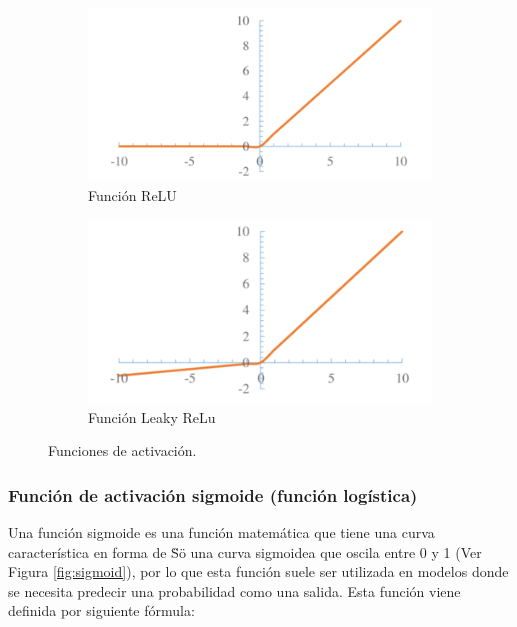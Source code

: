 \begin{figure}
        \begin{subfigure}[h]{0.45\textwidth} 
            \includegraphics[width=\textwidth]{imagenes/Cap4/relu}
            \caption{Funci\'{o}n ReLU}
            \label{fig:relu}
        \end{subfigure}       
        \begin{subfigure}[h]{0.45\textwidth} 
            \includegraphics[width=\textwidth]{imagenes/Cap4/l_relu}
            \caption{Funci\'{o}n Leaky ReLu}
            \label{fig:l_relu}
        \end{subfigure}
        \caption{Funciones de activaci\'{o}n.}
        
		\label{fig:nor_nor}
    \end{figure}
    
\subsubsection{Funci\'{o}n de activaci\'{o}n sigmoide (funci\'{o}n log\'{i}stica)}

Una funci\'{o}n sigmoide es una funci\'{o}n matem\'{a}tica que tiene una curva caracter\'{i}stica en forma de \"S\" o una curva sigmoidea que oscila entre 0 y 1 (Ver Figura \ref{fig:sigmoid}), por lo que esta funci\'{o}n suele ser utilizada en modelos donde se necesita predecir una probabilidad como una salida. Esta funci\'{o}n viene definida por siguiente f\'{o}rmula:


